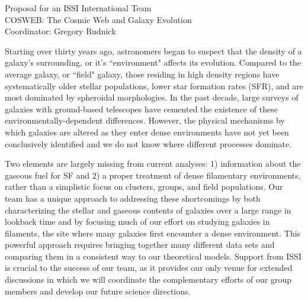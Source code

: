 \documentclass[11pt]{article}
\newcommand{\HRule}{\rule{\linewidth}{0.3mm}}
\begin{document}






\begin{center}
\large{Proposal for an ISSI International Team}\\
\Large{COSWEB: The Cosmic Web and Galaxy Evolution}\\
\medskip
\vspace{-0.2cm}
\large{Coordinator: Gregory Rudnick}\\
\end{center}

Starting over thirty years ago, astronomers began to suspect that the density of a galaxy's surrounding, or it's ``environment" affects its evolution.  Compared to the average galaxy, or ``field" galaxy, those residing in high density regions have systematically older stellar populations, lower star formation rates (SFR), and are most dominated by spheroidal morphologies.  In the past decade, large surveys of galaxies with ground-based telescopes have cemented the existence of these environmentally-dependent differences. However, the physical mechanisms by which galaxies are altered as they enter dense environments have not yet been conclusively identified and we do not know where different processes dominate.

Two elements are largely missing from current analyses: 1) information about the gaseous fuel for SF and 2) a proper treatment of dense filamentary environments, rather than a simplistic focus on clusters, groups, and field populations. Our team has a unique approach to addressing these shortcomings by both characterizing the stellar and gaseous contents of galaxies over a large range in lookback time and by focusing much of our effort on studying galaxies in filaments, the site where many galaxies first encounter a dense environment.  This powerful approach requires bringing together many different data sets and comparing them in a consistent way to our theoretical models.  Support from ISSI is crucial to the success of our team, as it provides our only venue for extended discussions in which we will coordinate the complementary efforts of our group members and develop our future science directions.
\end{document}

